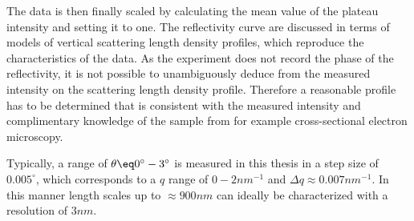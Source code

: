 \documentclass[\main/dresen_thesis.tex]{subfiles}
\begin{document}
    The data is then finally scaled by calculating the mean value of the plateau intensity and setting it to one.
    The reflectivity curve are discussed in terms of models of vertical scattering length density profiles, which reproduce the characteristics of the data.
    As the experiment does not record the phase of the reflectivity, it is not possible to unambiguously deduce from the measured intensity on the scattering length density profile.
    Therefore a reasonable profile has to be determined that is consistent with the measured intensity and complimentary knowledge of the sample from for example cross-sectional electron microscopy.

    Typically, a range of $\theta \eq 0^\circ - 3^\circ$ is measured in this thesis in a step size of $0.005^\circ$, which corresponds to a $q$ range of $0 - 2 \unit{nm^{-1}}$ and $\Delta q \approx 0.007 \unit{nm^{-1}}$.
    In this manner length scales up to $\approx 900 \unit{nm}$ can ideally be characterized with a resolution of $3 \unit{nm}$.
\end{document}
